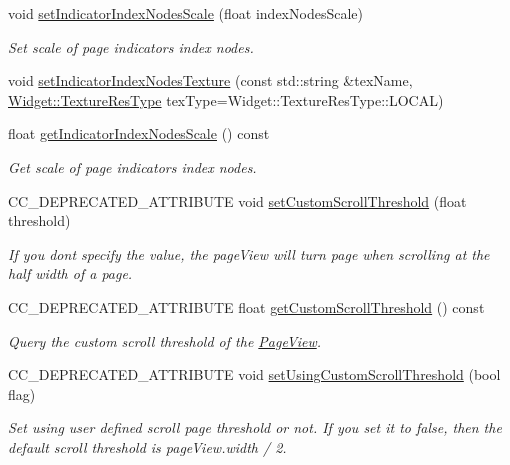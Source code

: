 \begin{DoxyCompactItemize}
void \hyperlink{classui_1_1PageView_a8660efb9530d9f8783b439e4ba0e2e63}{set\+Indicator\+Index\+Nodes\+Scale} (float index\+Nodes\+Scale)
\begin{DoxyCompactList}\small\item\em Set scale of page indicator\textquotesingle{}s index nodes. \end{DoxyCompactList}\item 
void \hyperlink{classui_1_1PageView_a1413a09228d8aa99d44afbd77b9354e4}{set\+Indicator\+Index\+Nodes\+Texture} (const std\+::string \&tex\+Name, \hyperlink{classui_1_1Widget_a040a65ec5ad3b11119b7e16b98bd9af0}{Widget\+::\+Texture\+Res\+Type} tex\+Type=Widget\+::\+Texture\+Res\+Type\+::\+L\+O\+C\+AL)
\item 
float \hyperlink{classui_1_1PageView_a651af56fb85c916b43daf98c54a3f863}{get\+Indicator\+Index\+Nodes\+Scale} () const
\begin{DoxyCompactList}\small\item\em Get scale of page indicator\textquotesingle{}s index nodes. \end{DoxyCompactList}\item 
C\+C\+\_\+\+D\+E\+P\+R\+E\+C\+A\+T\+E\+D\+\_\+\+A\+T\+T\+R\+I\+B\+U\+TE void \hyperlink{classui_1_1PageView_a10f9b43ef5ebff540e6546ed810d1be4}{set\+Custom\+Scroll\+Threshold} (float threshold)
\begin{DoxyCompactList}\small\item\em If you don\textquotesingle{}t specify the value, the page\+View will turn page when scrolling at the half width of a page. \end{DoxyCompactList}\item 
C\+C\+\_\+\+D\+E\+P\+R\+E\+C\+A\+T\+E\+D\+\_\+\+A\+T\+T\+R\+I\+B\+U\+TE float \hyperlink{classui_1_1PageView_a36048cfcf389a27b898960c9596ad8bf}{get\+Custom\+Scroll\+Threshold} () const
\begin{DoxyCompactList}\small\item\em Query the custom scroll threshold of the \hyperlink{classui_1_1PageView}{Page\+View}. \end{DoxyCompactList}\item 
C\+C\+\_\+\+D\+E\+P\+R\+E\+C\+A\+T\+E\+D\+\_\+\+A\+T\+T\+R\+I\+B\+U\+TE void \hyperlink{classui_1_1PageView_a1e01540660aa7c0c79ae736929f4784b}{set\+Using\+Custom\+Scroll\+Threshold} (bool flag)
\begin{DoxyCompactList}\small\item\em Set using user defined scroll page threshold or not. If you set it to false, then the default scroll threshold is page\+View.\+width / 2. \end{DoxyCompactList}\item 

\end{DoxyCompactItemize}
